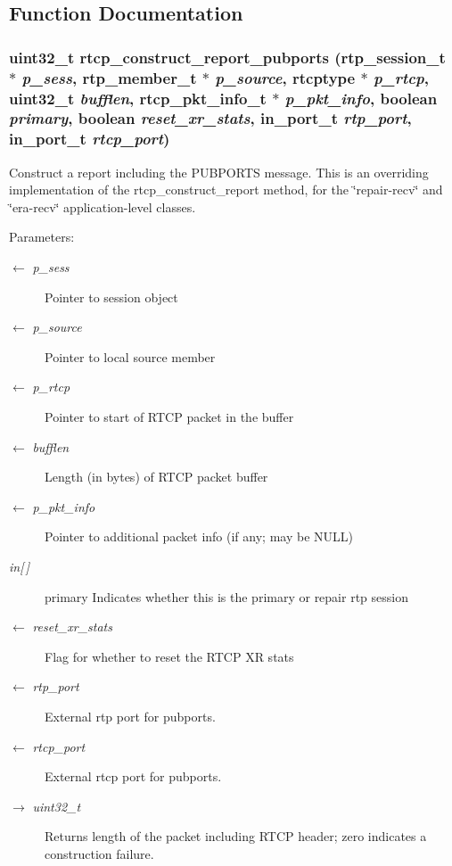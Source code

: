 \subsection{Function Documentation}
\subsubsection{\setlength{\rightskip}{0pt plus 5cm}uint32\_\-t rtcp\_\-construct\_\-report\_\-pubports (rtp\_\-session\_\-t $\ast$ {\em p\_\-sess}, rtp\_\-member\_\-t $\ast$ {\em p\_\-source}, rtcptype $\ast$ {\em p\_\-rtcp}, uint32\_\-t {\em bufflen}, rtcp\_\-pkt\_\-info\_\-t $\ast$ {\em p\_\-pkt\_\-info}, boolean {\em primary}, boolean {\em reset\_\-xr\_\-stats}, in\_\-port\_\-t {\em rtp\_\-port}, in\_\-port\_\-t {\em rtcp\_\-port})}\label{vqec__rtp_8h_a3b35e0f9039796566fd84aed604c932}


Construct a report including the PUBPORTS message. This is an overriding implementation of the rtcp\_\-construct\_\-report method, for the \char`\"{}repair-recv\char`\"{} and \char`\"{}era-recv\char`\"{} application-level classes.

\begin{Desc}
\item[Parameters:]
\begin{description}
\item[\mbox{$\leftarrow$} {\em p\_\-sess}]Pointer to session object \item[\mbox{$\leftarrow$} {\em p\_\-source}]Pointer to local source member \item[\mbox{$\leftarrow$} {\em p\_\-rtcp}]Pointer to start of RTCP packet in the buffer \item[\mbox{$\leftarrow$} {\em bufflen}]Length (in bytes) of RTCP packet buffer \item[\mbox{$\leftarrow$} {\em p\_\-pkt\_\-info}]Pointer to additional packet info (if any; may be NULL) \item[{\em in\mbox{[}$\,$\mbox{]}}]primary Indicates whether this is the primary or repair rtp session \item[\mbox{$\leftarrow$} {\em reset\_\-xr\_\-stats}]Flag for whether to reset the RTCP XR stats \item[\mbox{$\leftarrow$} {\em rtp\_\-port}]External rtp port for pubports. \item[\mbox{$\leftarrow$} {\em rtcp\_\-port}]External rtcp port for pubports. \item[\mbox{$\rightarrow$} {\em uint32\_\-t}]Returns length of the packet including RTCP header; zero indicates a construction failure. \end{description}
\end{Desc}
